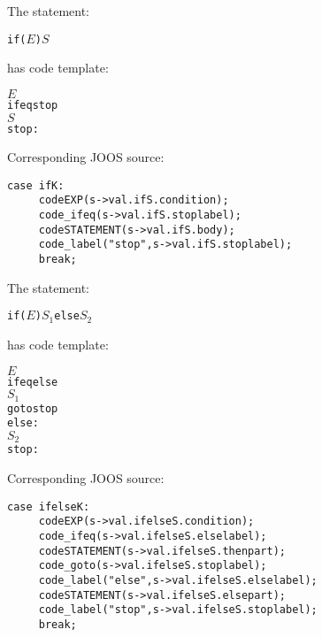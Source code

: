 \newcommand{\mm}[1]{$#1$}
 
\begin{slide*}
The statement:

\begin{scriptsize}
\begin{alltt}
    if (\mm{E}) \mm{S}
\end{alltt}
\end{scriptsize}

has code template:

\begin{scriptsize}
\begin{alltt}
    \mm{E}
    ifeq stop
    \mm{S}
    stop:
\end{alltt}
\end{scriptsize}

Corresponding JOOS source:

\begin{scriptsize}
\begin{verbatim}
case ifK:
     codeEXP(s->val.ifS.condition);
     code_ifeq(s->val.ifS.stoplabel);
     codeSTATEMENT(s->val.ifS.body);
     code_label("stop",s->val.ifS.stoplabel);
     break;
\end{verbatim}
\end{scriptsize}

\vfil
\end{slide*}
 
\begin{slide*}
The statement:
 
\begin{scriptsize}
\begin{alltt}
     if (\mm{E}) \mm{S_1} else \mm{S_2}
\end{alltt}
\end{scriptsize}
 
has code template:
 
\begin{scriptsize}
\begin{alltt}
     \mm{E}
     ifeq else
     \mm{S_1}
     goto stop
     else:
     \mm{S_2}
     stop:
\end{alltt}
\end{scriptsize}
 
Corresponding JOOS source:
 
\begin{scriptsize}
\begin{verbatim}
case ifelseK:
     codeEXP(s->val.ifelseS.condition);
     code_ifeq(s->val.ifelseS.elselabel);
     codeSTATEMENT(s->val.ifelseS.thenpart);
     code_goto(s->val.ifelseS.stoplabel);
     code_label("else",s->val.ifelseS.elselabel);
     codeSTATEMENT(s->val.ifelseS.elsepart);
     code_label("stop",s->val.ifelseS.stoplabel);
     break;
\end{verbatim}
\end{scriptsize}
\vfil
\end{slide*}

